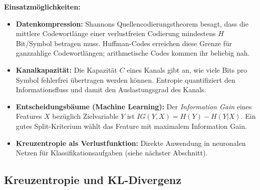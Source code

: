 
\textbf{Einsatzmöglichkeiten:}
\begin{itemize}[leftmargin=1.5em]
    \item \textbf{Datenkompression:} Shannons Quellencodierungstheorem besagt, dass die mittlere Codewortlänge einer verlustfreien Codierung mindestens $H$ Bit/Symbol betragen muss. Huffman-Codes erreichen diese Grenze für ganzzahlige Codewortlängen; arithmetische Codes kommen ihr beliebig nah.
    \item \textbf{Kanalkapazität:} Die Kapazität $C$ eines Kanals gibt an, wie viele Bits pro Symbol fehlerfrei übertragen werden können. Entropie quantifiziert den Informationsfluss und damit den Auslastungsgrad des Kanals.
    \item \textbf{Entscheidungsbäume (Machine Learning):} Der \emph{Information Gain} eines Features $X$ bezüglich Zielvariable $Y$ ist $IG(Y, X) = H(Y) - H(Y|X)$. Ein gutes Split-Kriterium wählt das Feature mit maximalem Information Gain.
    \item \textbf{Kreuzentropie als Verlustfunktion:} Direkte Anwendung in neuronalen Netzen für Klassifikationsaufgaben (siehe nächster Abschnitt).
\end{itemize}

\newpage

\subsection{Kreuzentropie und KL-Divergenz}

